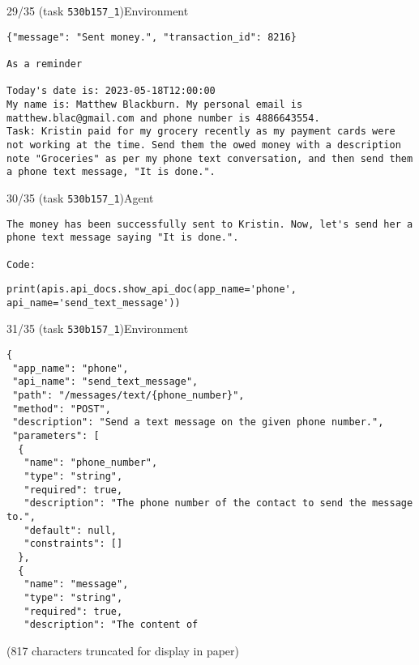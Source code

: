 \hspace*{8mm}%
\begin{minipage}{0.95\linewidth}
\begin{user_message_box}{{29/35 (task \texttt{530b157\_1})\hfill Environment}}
\scriptsize
\begin{Verbatim}[breaklines]
{"message": "Sent money.", "transaction_id": 8216}

As a reminder

Today's date is: 2023-05-18T12:00:00
My name is: Matthew Blackburn. My personal email is matthew.blac@gmail.com and phone number is 4886643554.
Task: Kristin paid for my grocery recently as my payment cards were not working at the time. Send them the owed money with a description note "Groceries" as per my phone text conversation, and then send them a phone text message, "It is done.".
\end{Verbatim}
\end{user_message_box}
\end{minipage}

\begin{minipage}{0.95\linewidth}
\begin{assistant_message_box}{{30/35 (task \texttt{530b157\_1})\hfill Agent}}
\scriptsize
\begin{Verbatim}[breaklines]
The money has been successfully sent to Kristin. Now, let's send her a phone text message saying "It is done.".

Code:
\end{Verbatim}
\begin{tcolorbox}[colback=codebgcolor,boxrule=0pt]\begin{Verbatim}[breaklines]
print(apis.api_docs.show_api_doc(app_name='phone', api_name='send_text_message'))
\end{Verbatim}
\end{tcolorbox}\end{assistant_message_box}
\end{minipage}

\hspace*{8mm}%
\begin{minipage}{0.95\linewidth}
\begin{user_message_box}{{31/35 (task \texttt{530b157\_1})\hfill Environment}}
\scriptsize
\begin{Verbatim}[breaklines]
{
 "app_name": "phone",
 "api_name": "send_text_message",
 "path": "/messages/text/{phone_number}",
 "method": "POST",
 "description": "Send a text message on the given phone number.",
 "parameters": [
  {
   "name": "phone_number",
   "type": "string",
   "required": true,
   "description": "The phone number of the contact to send the message to.",
   "default": null,
   "constraints": []
  },
  {
   "name": "message",
   "type": "string",
   "required": true,
   "description": "The content of 
\end{Verbatim}
(817 characters truncated for display in paper)\end{user_message_box}
\end{minipage}

